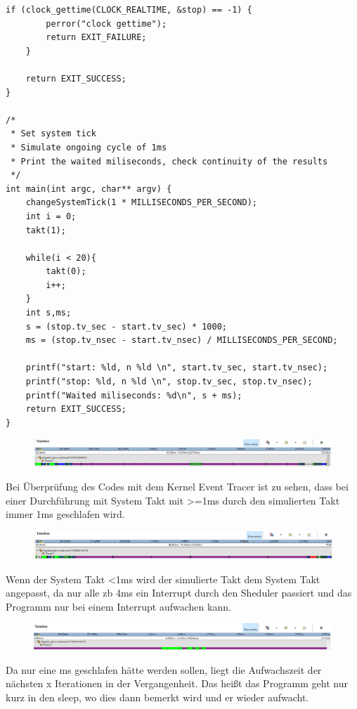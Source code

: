 \documentclass[12pt,a4paper,bibliography=totocnumbered]{scrartcl}
\begin{document}
\begin{lstlisting}[style=CStyle]
	if (clock_gettime(CLOCK_REALTIME, &stop) == -1) {
		perror("clock gettime");
		return EXIT_FAILURE;
	}

	return EXIT_SUCCESS;
}

/*
 * Set system tick
 * Simulate ongoing cycle of 1ms
 * Print the waited miliseconds, check continuity of the results
 */
int main(int argc, char** argv) {
	changeSystemTick(1 * MILLISECONDS_PER_SECOND);
	int i = 0;
	takt(1);

	while(i < 20){
		takt(0);
		i++;
	}
	int s,ms;
	s = (stop.tv_sec - start.tv_sec) * 1000;
	ms = (stop.tv_nsec - start.tv_nsec) / MILLISECONDS_PER_SECOND;

	printf("start: %ld, n %ld \n", start.tv_sec, start.tv_nsec);
	printf("stop: %ld, n %ld \n", stop.tv_sec, stop.tv_nsec);
	printf("Waited miliseconds: %d\n", s + ms);
	return EXIT_SUCCESS;
}
\end{lstlisting}

\begin{figure}[h]
\includegraphics[width=\textwidth]{bilder/QNX_Abgabe2}
\centering
\end{figure}
Bei Überprüfung des Codes mit dem Kernel Event Tracer ist zu sehen, dass bei einer Durchführung mit System Takt mit >=1ms durch den simulierten Takt immer 1ms geschlafen wird.

\begin{figure}[h]
\includegraphics[width=\textwidth]{bilder/QNX_Abgabe2_4sec}
\centering
\end{figure}
Wenn der System Takt <1ms wird der simulierte Takt dem System Takt angepasst, da nur alle zb 4ms ein Interrupt durch den Sheduler passiert und das Programm nur bei einem Interrupt aufwachen kann.

\begin{figure}[h]
\includegraphics[width=\textwidth]{bilder/QNX_Abgabe2_4ticks}
\centering
\end{figure}
Da nur eine ms geschlafen hätte werden sollen, liegt die Aufwachszeit der nächsten x Iterationen in der Vergangenheit. Das heißt das Programm geht nur kurz in den sleep, wo dies dann bemerkt wird und er wieder aufwacht.

\end{document}
